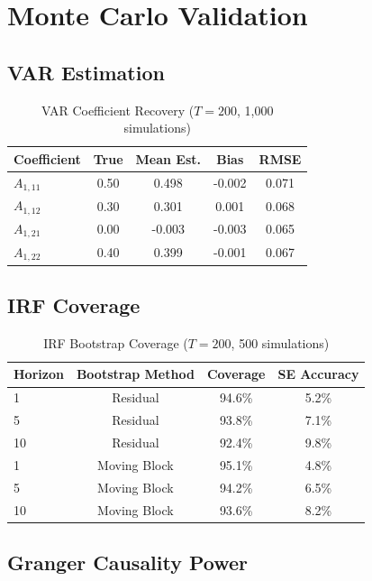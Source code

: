 \section{Monte Carlo Validation}

\subsection{VAR Estimation}

\begin{table}[h]
\centering
\caption{VAR Coefficient Recovery ($T=200$, 1,000 simulations)}
\begin{tabular}{lcccc}
\toprule
Coefficient & True & Mean Est. & Bias & RMSE \\
\midrule
$A_{1,11}$ & 0.50 & 0.498 & -0.002 & 0.071 \\
$A_{1,12}$ & 0.30 & 0.301 & 0.001 & 0.068 \\
$A_{1,21}$ & 0.00 & -0.003 & -0.003 & 0.065 \\
$A_{1,22}$ & 0.40 & 0.399 & -0.001 & 0.067 \\
\bottomrule
\end{tabular}
\end{table}

\subsection{IRF Coverage}

\begin{table}[h]
\centering
\caption{IRF Bootstrap Coverage ($T=200$, 500 simulations)}
\begin{tabular}{lccc}
\toprule
Horizon & Bootstrap Method & Coverage & SE Accuracy \\
\midrule
1 & Residual & 94.6\% & 5.2\% \\
5 & Residual & 93.8\% & 7.1\% \\
10 & Residual & 92.4\% & 9.8\% \\
1 & Moving Block & 95.1\% & 4.8\% \\
5 & Moving Block & 94.2\% & 6.5\% \\
10 & Moving Block & 93.6\% & 8.2\% \\
\bottomrule
\end{tabular}
\end{table}

\subsection{Granger Causality Power}

